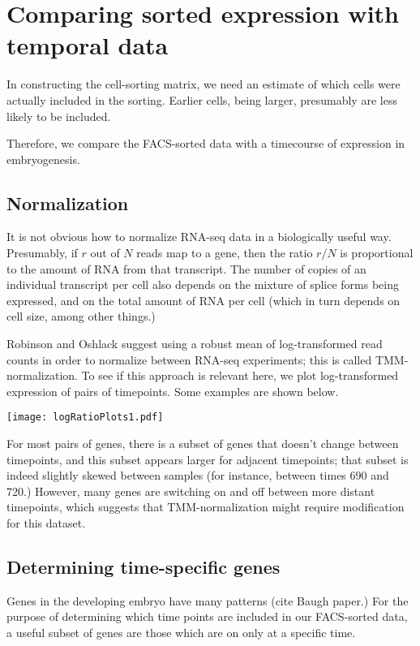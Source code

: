 \documentclass{article}
\begin{document}
\section*{Comparing sorted expression with temporal data}

In constructing the cell-sorting matrix, we need an estimate of which cells
were actually included in the sorting. Earlier cells, being larger, presumably
are less likely to be included.

Therefore, we compare the FACS-sorted data with a timecourse of expression
in embryogenesis.

\subsection*{Normalization}

It is not obvious how to normalize RNA-seq data in a biologically useful way.
Presumably, if $r$ out of $N$ reads map to a gene, then the ratio $r/N$ is
proportional to the amount of RNA from that transcript. The number of copies
of an individual transcript per cell also depends on the mixture of splice forms
being expressed, and on the total amount of RNA per cell (which in turn
depends on cell size, among other things.)

Robinson and Oshlack suggest using a robust mean of log-transformed read counts
in order to normalize between RNA-seq experiments; this is called TMM-normalization.
To see if this approach is
relevant here, we plot log-transformed expression of pairs of timepoints.
Some examples are shown below.

\texttt{[image: logRatioPlots1.pdf]}

For most pairs of genes, there is a subset of genes that doesn't change between
timepoints, and this subset appears larger for adjacent timepoints; that subset is
indeed slightly skewed between samples (for instance, between times 690 and 720.)
However, many genes are switching on and off between more distant timepoints,
which suggests
that TMM-normalization might require modification for this dataset.

\subsection*{Determining time-specific genes}

Genes in the developing embryo have many patterns (cite Baugh paper.)
For the purpose of determining which time points are included in our FACS-sorted
data, a useful subset of genes are those which are on only at a specific time.
\end{document}
